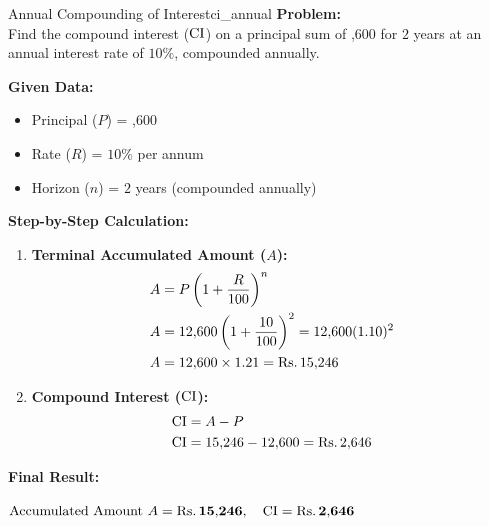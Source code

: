 \begin{example}{Annual Compounding of Interest}{ci_annual}
\textbf{Problem:} \\
Find the compound interest ($\operatorname{CI}$) on a principal sum of ,600 for $2$ years at an annual interest rate of $10\%$, compounded annually.

\tcbline
\textbf{Given Data:}
\begin{itemize}[noitemsep]
    \item Principal ($P$) = ,600
    \item Rate ($R$) = $10\%$ per annum
    \item Horizon ($n$) = $2$ years (compounded annually)
\end{itemize}

\textbf{Step-by-Step Calculation:}
\begin{enumerate}[leftmargin=*]
    \item \textbf{Terminal Accumulated Amount ($A$):}
    \begin{align*}
        A &= P\left(1 + \frac{R}{100}\right)^n \\
        A &= 12{,}600\left(1 + \frac{10}{100}\right)^2 = 12{,}600(1.10)^2 \\
        A &= 12{,}600 \times 1.21 = \text{Rs.}\, 15{,}246
    \end{align*}
    
    \item \textbf{Compound Interest ($\operatorname{CI}$):}
    \begin{align*}
        \operatorname{CI} &= A - P \\
        \operatorname{CI} &= 15{,}246 - 12{,}600 = \text{Rs.}\, 2{,}646
    \end{align*}
\end{enumerate}

\textbf{Final Result:}
\begin{center}
    $\text{Accumulated Amount } A = \mathbf{\text{Rs.}\, 15{,}246}, \quad \operatorname{CI} = \mathbf{\text{Rs.}\, 2{,}646}$
\end{center}
\end{example}

